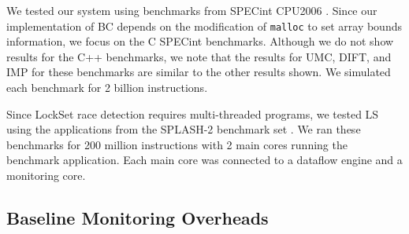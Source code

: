 We tested our system using benchmarks from SPECint
CPU2006 \cite{spec2006}. Since our implementation of BC depends on the
modification of {\tt malloc} to set array bounds information, we focus on the C
SPECint benchmarks. Although we do not
show results for the C++ benchmarks, we note that the results for UMC, DIFT, and IMP
for these benchmarks are similar to the other results shown.
We simulated each benchmark for 2 billion instructions. 

Since LockSet race detection requires multi-threaded programs, we tested LS using
the applications from the SPLASH-2 benchmark set \cite{splash-isca95}. We ran these benchmarks for
200 million instructions with 2 main cores running the benchmark application.
Each main core was connected to a dataflow engine and a monitoring core.

\subsection{Baseline Monitoring Overheads}



